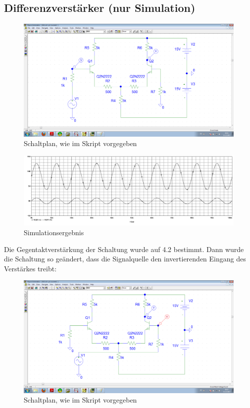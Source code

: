 \setcounter{section}{6}

\subsection{Differenzverstärker (nur Simulation)}
\begin{figure}[H]
	\centering
	\includegraphics[width=\linewidth]{versuch6/spice/schem611.png}
	\caption{Schaltplan, wie im Skript vorgegeben}
\end{figure}
\begin{figure}[H]
	\centering
	\includegraphics[width=\linewidth]{versuch6/spice/611.png}
	\caption{Simulationsergebnis}
\end{figure}
Die Gegentaktverstärkung der Schaltung wurde auf 4.2 bestimmt.
Dann wurde die Schaltung so geändert, dass die Signalquelle den invertierenden Eingang des Verstärkes treibt:
\begin{figure}[H]
	\centering
	\includegraphics[width=\linewidth]{versuch6/spice/schem612.png}
	\caption{Schaltplan, wie im Skript vorgegeben}
\end{figure}

